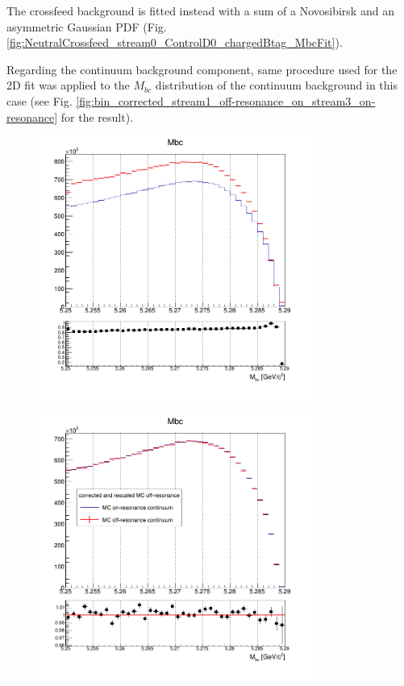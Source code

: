 \noindent The crossfeed background is fitted instead with a sum of a Novosibirsk and an asymmetric Gaussian PDF (Fig. \ref{fig:NeutralCrossfeed_stream0_ControlD0_chargedBtag_MbcFit}).\\
\vspace{0.05 cm}

\noindent Regarding the continuum background component, same procedure used for the 2D fit was applied to the $M_{bc}$ distribution of the continuum background in this case (see Fig. \ref{fig:bin_corrected_stream1_off-resonance_on_stream3_on-resonance} for the result).

\begin{figure}[H]
\begin{minipage}{.5\textwidth}
  \centering
  {\includegraphics[width=0.80\textwidth]{05-chargedControlSample/figs/NEWstream0_chargedBtag_rescaled_off-on_resonance.png}}
\end{minipage}%
\begin{minipage}{.5\textwidth}
{\includegraphics[width=0.80\textwidth]{05-chargedControlSample/figs/bin_corrected_stream1_off-resonance_on_stream3_on-resonance.png}}

\end{minipage}
\end{figure}
